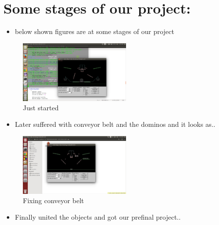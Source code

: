 \documentclass[10pt,a4paper]{article}
\begin{document}
\section*{\textbf{Some stages of our project:}}
 \begin{itemize}[itemsep = -0.75 mm, leftmargin=*]
  \item below shown figures are at some stages of our project
 \end{itemize}
 
 \begin{figure}[!htb]
 \begin{centering}
 \includegraphics[width=0.5\textwidth]{bareinitial.png}
 \end{centering}
 \caption{Just started}
 \end{figure}
 \vspace{-10pt}
  
  \begin{itemize}[itemsep = -0.75 mm, leftmargin=*]
  \item Later suffered with conveyor belt and the dominos and it looks as..
 \end{itemize}

 \begin{figure}[!htb]
 \begin{centering}
 \includegraphics[width=0.5\textwidth]{middle.jpg}
 \end{centering}
 \caption{Fixing conveyor belt}
 \end{figure}
 \vspace{-10pt}
 
  \begin{itemize}[itemsep = -0.75 mm, leftmargin=*]
  \item Finally united the objects and got our prefinal project..
 \end{itemize}
\end{document}
